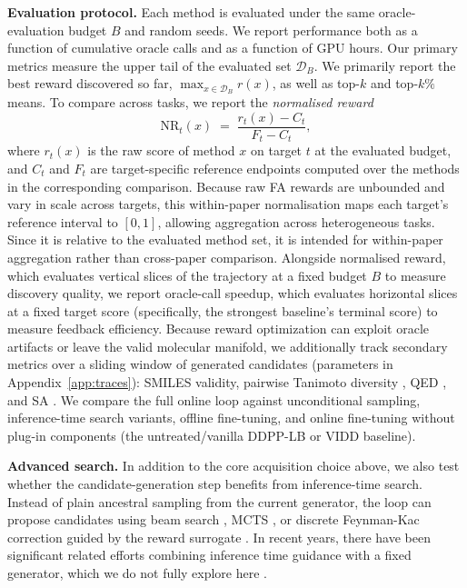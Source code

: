 \textbf{Evaluation protocol.}
Each method is evaluated under the same oracle-evaluation budget $B$ and random seeds. We report performance both as a function of cumulative oracle calls and as a function of GPU hours. Our primary metrics measure the upper tail of the evaluated set $\mathcal{D}_B$. We primarily report the best reward discovered so far, $\max_{x\in\mathcal{D}_B} r(x)$, as well as top-$k$ and top-$k\%$ means. To compare across tasks, we report the \emph{normalised reward}
\begin{equation}
\mathrm{NR}_t(x) \;=\; \frac{r_t(x)-C_t}{F_t-C_t},
\label{eq:lift}
\end{equation}
where $r_t(x)$ is the raw score of method $x$ on target $t$ at the evaluated budget, and $C_t$ and $F_t$ are target-specific reference endpoints computed over the methods in the corresponding comparison. Because raw FA rewards are unbounded and vary in scale across targets, this within-paper normalisation maps each target's reference interval to $[0,1]$, allowing aggregation across heterogeneous tasks. Since it is relative to the evaluated method set, it is intended for within-paper aggregation rather than cross-paper comparison. Alongside normalised reward, which evaluates vertical slices of the trajectory at a fixed budget $B$ to measure discovery quality, we report oracle-call speedup, which evaluates horizontal slices at a fixed target score (specifically, the strongest baseline's terminal score) to measure feedback efficiency. Because reward optimization can exploit oracle artifacts or leave the valid molecular manifold, we additionally track secondary metrics over a sliding window of generated candidates (parameters in Appendix~\ref{app:traces}): SMILES validity, pairwise Tanimoto diversity \citep{bajusz2015tanimoto}, QED \citep{bickerton2012qed}, and SA \citep{ertl2009sa}. We compare the full online loop against unconditional sampling, inference-time search variants, offline fine-tuning, and online fine-tuning without plug-in components (the untreated/vanilla
DDPP-LB or VIDD baseline).

\textbf{Advanced search.}
In addition to the core acquisition choice above, we also test whether the candidate-generation step benefits from inference-time search. Instead of plain ancestral sampling from the current generator, the loop can propose candidates using beam search \citep{ramesh2025noisetrajectory}, MCTS \citep{tangTR2D2TreeSearch2025}, or discrete Feynman-Kac correction \citep{hasanDiscreteFeynmanKacCorrectors2026, skretaFeynmanKacCorrectorsDiffusion2025} guided by the reward surrogate \citep{yangSteeringGenerativeModels2025}. In recent years, there have been significant related efforts combining inference time guidance with a fixed generator, which we do not fully explore here \citep{didi2026scaling, wangFineTuningDiscreteDiffusion2024, singhalGeneralFrameworkInferencetime2025, liDerivativeFreeGuidanceContinuous2024, nisonoffUnlockingGuidanceDiscrete2025, gruverProteinDesignGuided2023,  xiongProteinGuideOntheflyProperty2026, luProVADAGenerationSubcellular2025, ueharaRewardGuidedIterativeRefinement2025, liDynamicSearchInferenceTime2025, jianGeneralBindingAffinity2026, yangHitLeadDiscovery, tangPepTuneNovoGeneration2024, tangTR2D2TreeSearch2025, yangSteeringGenerativeModels2025}.
